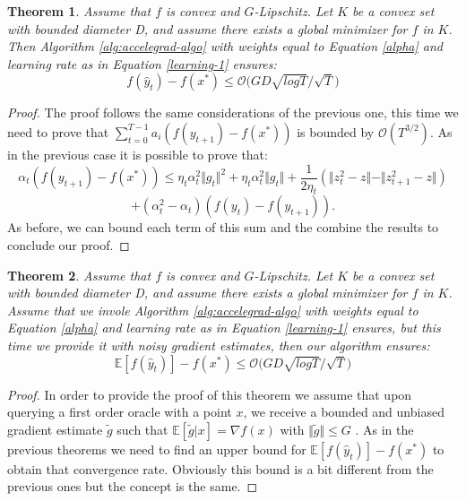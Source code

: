 \documentclass[12pt]{article}
\newtheorem{theorem}{Theorem}
\theoremstyle{definition}
\begin{document}
\begin{theorem}
Assume that $f$ is convex and $G$-Lipschitz. Let $K$ be a convex set with bounded diameter D, and assume there exists a global minimizer for $f$ in $K$. Then Algorithm \ref{alg:accelegrad-algo} with weights equal to Equation \ref{alpha} and learning rate as in Equation \ref{learning-1} ensures:
$$
f(\hat y_t) - f(x^*) \leq \mathcal{O} \bigg ( GD \sqrt{log T} / \sqrt{T} \bigg)
$$
\label{Theorem-2-acc}
\end{theorem}

\begin{proof}
The proof follows the same considerations of the previous one, this time we need to prove that $\sum_{t=0}^{T-1} a_i ( f(y_{t+1}) - f(x^*) )$ is bounded by $\mathcal{O}(T^{3/2})$. As in the previous case it is possible to prove that:
$$
\alpha_t (f(y_{t+1}) - f(x^*)) \leq \eta_t \alpha_t^2 \Vert g_t \Vert^2 + \eta_t \alpha_t^2 \Vert g_t \Vert + \frac{1}{2 \eta_t} ( \Vert z_t^2 - z \Vert - \Vert z_{t+1}^2 - z \Vert) 
$$
$$
+ (\alpha_t^2 -\alpha_t)(f(y_t)-f(y_{t+1})).
$$
As before, we can bound each term of this sum and the combine the results to conclude our proof.
\end{proof}

\begin{theorem}
Assume that $f$ is convex and $G$-Lipschitz. Let $K$ be a convex set with bounded diameter D, and assume there exists a global minimizer for $f$ in $K$. Assume that we invole Algorithm \ref{alg:accelegrad-algo} with weights equal to Equation \ref{alpha} and learning rate as in Equation \ref{learning-1} ensures, but this time we provide it with noisy gradient estimates, then our algorithm ensures:
$$
\mathbb{E}[f(\hat y_t)] - f(x^*) \leq \mathcal{O} \bigg ( GD \sqrt{log T} / \sqrt{T} \bigg)
$$
\label{Theorem-2-acc}
\end{theorem}

\begin{proof}
In order to provide the proof of this theorem we assume that upon querying a first order oracle with a point $x$, we receive a bounded and unbiased gradient estimate $\tilde g$ such that $\mathbb{E}[\tilde g | x] = \nabla f(x)$ with $\Vert \tilde g \Vert \leq G$	. As in the previous theorems we need to find an upper bound for $\mathbb{E}[f(\hat y_t)] - f(x^*)$ to obtain that convergence rate. Obviously this bound is a bit different from the previous ones but the concept is the same.  

\end{proof}
\end{document}
